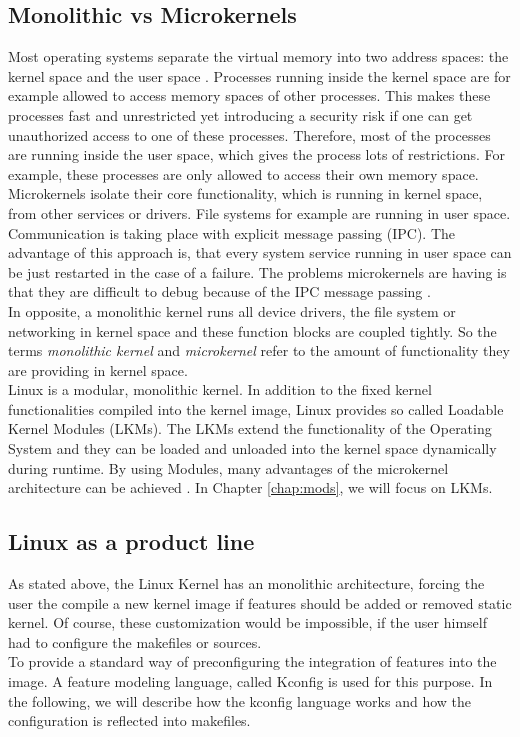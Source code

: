 \documentclass{sig-alternate-05-2015}
\begin{document}
\subsection{Monolithic vs Microkernels}
Most operating systems separate the virtual memory into two address spaces: the kernel space and the user space \cite{stankov2006discussion}. Processes running inside the kernel space are for example allowed to access memory spaces of other processes. This makes these processes fast and unrestricted yet introducing a security risk if one can get unauthorized access to one of these processes. Therefore, most of the processes are running inside the user space, which gives the process lots of restrictions. For example, these processes are only allowed to access their own memory space. \\
Microkernels isolate their core functionality, which is running in kernel space, from other services or drivers. File systems for example are running in user space. Communication is taking place with explicit message passing (IPC). The advantage of this approach is, that every system service running in user space can be just restarted in the case of a failure. The problems microkernels are having is that they are difficult to debug because of the IPC message passing \cite{le2005gnu}. \\
In opposite, a monolithic kernel runs all device drivers, the file system or networking in kernel space and these function blocks are coupled tightly. 
So the terms \emph{monolithic kernel} and \emph{microkernel} refer to the amount of functionality they are providing in kernel space.\\
Linux is a modular, monolithic kernel. In addition to the fixed kernel functionalities compiled into the kernel image, Linux provides so called Loadable Kernel Modules (LKMs). The LKMs extend the functionality of the Operating System and they can be loaded and unloaded into the kernel space dynamically during runtime. By using Modules,  many advantages of the microkernel architecture can be achieved \cite[pp. 11]{bovet2005understanding}. In Chapter \ref{chap:mods}, we will focus on LKMs. \\


\subsection{Linux as a product line}
As stated above, the Linux Kernel has an monolithic architecture, forcing the user the compile a new kernel image if features should be added or removed static kernel. Of course, these customization would be impossible, if the user himself had to configure the makefiles or sources.\\
To provide a standard way of preconfiguring the integration of features into the image. A feature modeling language, called Kconfig \cite{kconfig} is used for this purpose. In the following, we will describe how the kconfig language works and how the configuration is reflected into makefiles.
\end{document}
